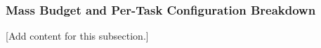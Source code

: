 
\subsubsection{Mass Budget and Per-Task Configuration Breakdown}
\label{subsubsec:design_3_1_mass_budget_task_breakdown}

[Add content for this subsection.]
